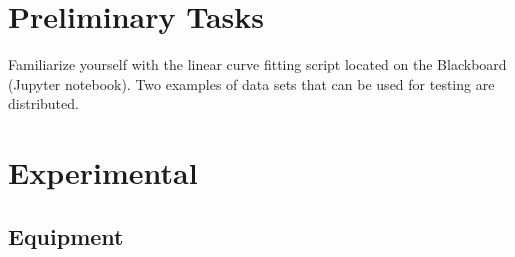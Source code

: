 \documentclass[../Elmag-labhefte-2020.tex]{subfiles}
\begin{document}






\section{Preliminary Tasks}
Familiarize yourself with the linear curve fitting script located on the Blackboard (Jupyter notebook). Two examples of data sets that can be used for testing are distributed.

\section{Experimental \label{ch.kraft.eksp}}

\subsection{Equipment}
\end{document}
